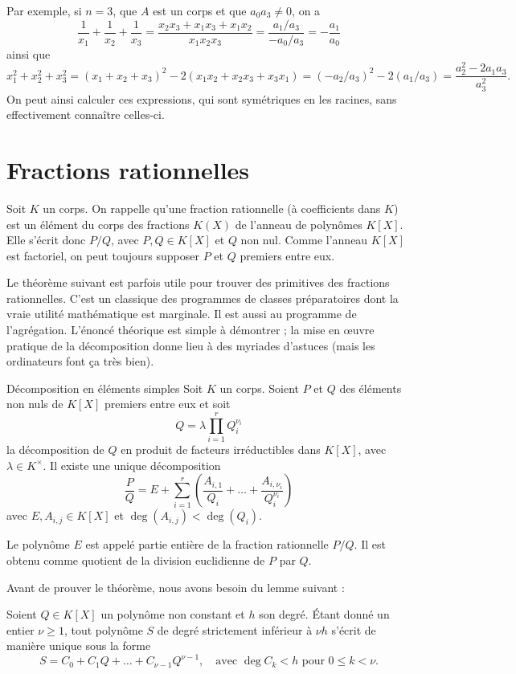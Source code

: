 \documentclass[]{report}
\begin{document}
Par exemple, si $n = 3$, que $A$ est un corps et que $a_0 a_3 \neq 0$, on a
\[\frac{1}{x_1} + \frac{1}{x_2} + \frac{1}{x_3} = \frac{x_2 x_3 + x_1 x_3 + x_1 x_2}{x_1 x_2 x_3} = \frac{a_1/a_3}{-a_0/a_3} = -\frac{a_1}{a_0}\]
ainsi que
\[x_1^2 + x_2^2 + x_3^2 = (x_1 + x_2 + x_3)^2 - 2(x_1 x_2 + x_2 x_3 + x_3 x_1) = (-a_2/a_3)^2 - 2(a_1/a_3) = \frac{a_2^2 - 2a_1 a_3}{a_3^2}.\]
On peut ainsi calculer ces expressions, qui sont symétriques en les racines, sans effectivement connaître celles-ci.

\section{Fractions rationnelles}

Soit $K$ un corps. On rappelle qu'une fraction rationnelle (à coefficients dans $K$) est un élément du corps des fractions $K(X)$ de l'anneau de polynômes $K[X]$. Elle s'écrit donc $P/Q$, avec $P, Q \in K[X]$ et $Q$ non nul. Comme l'anneau $K[X]$ est factoriel, on peut toujours supposer $P$ et $Q$ premiers entre eux.

Le théorème suivant est parfois utile pour trouver des primitives des fractions rationnelles. C'est un classique des programmes de classes préparatoires dont la vraie utilité mathématique est marginale. Il est aussi au programme de l'agrégation. L'énoncé théorique est simple à démontrer ; la mise en œuvre pratique de la décomposition donne lieu à des myriades d'astuces (mais les ordinateurs font ça très bien).

\begin{tm}{Décomposition en éléments simples}{}
    Soit $K$ un corps. Soient $P$ et $Q$ des éléments non nuls de $K[X]$ premiers entre eux et soit
    \[Q = \lambda \prod_{i = 1}^{r} Q_i^{\nu_i}\]
    la décomposition de $Q$ en produit de facteurs irréductibles dans $K[X]$, avec $\lambda \in K^{\times}$. Il existe une unique décomposition
    \[\frac{P}{Q} = E + \sum_{i = 1}^{r}\left(\frac{A_{i,1}}{Q_i} + \dots + \frac{A_{i,\nu_i}}{Q_i^{\nu_i}}\right)\]
    avec $E, A_{i,j} \in K[X]$ et $\deg(A_{i,j}) < \deg(Q_i)$.

    Le polynôme $E$ est appelé partie entière de la fraction rationnelle $P/Q$. Il est obtenu comme quotient de la division euclidienne de $P$ par $Q$.
\end{tm}

Avant de prouver le théorème, nous avons besoin du lemme suivant :

\begin{lm}{}{}
    Soient $Q \in K[X]$ un polynôme non constant et $h$ son degré. Étant donné un entier $\nu \ge 1$, tout polynôme $S$ de degré strictement inférieur à $\nu h$ s'écrit de manière unique sous la forme
    \[S = C_0 + C_1 Q + \dots + C_{\nu - 1} Q^{\nu - 1}, \quad \text{avec } \deg C_k < h \text{ pour } 0 \le k < \nu. \tag{1.6}\]
\end{lm}
\end{document}
